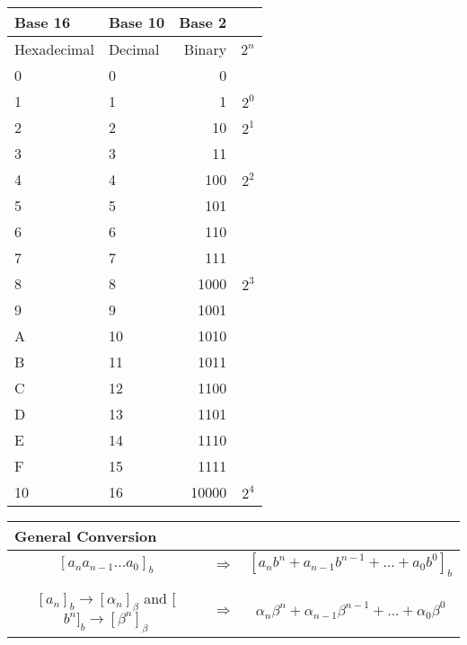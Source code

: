 \documentclass[11pt,a4paper]{article}
\begin{document}
\begin{table}[H]
\begin{tabular}{ll}
\end{tabular} 
\quad
\begin{tabular}{|llr|r} \midrule
Base 16 	& Base 10 & Base 2 \\ \midrule
Hexadecimal & Decimal & Binary & $2^{n}$\\ \midrule \midrule 
0 	& 0 	& 0 	\\ 
1 	& 1 	& 1 & $2^{0}$	\\ 
2 	& 2 	& 10 & $2^{1}$	\\ 
3 	& 3 	& 11 	\\ 
4 	& 4 	& 100 & $2^{2}$	\\ 
5 	& 5 	& 101 	\\ 
6 	& 6 	& 110 	\\ 
7 	& 7 	& 111 	\\ 
8 	& 8 	& 1000	& $2^{3}$\\ 
9 	& 9 	& 1001 	\\ 
A 	& 10 	& 1010 	\\ 
B 	& 11 	& 1011 	\\ 
C 	& 12 	& 1100 	\\ 
D 	& 13 	& 1101 	\\ 
E 	& 14 	& 1110 	\\ 
F 	& 15 	& 1111 	\\ 
10 	& 16 	& 10000 &$2^{4}$\\ \midrule
\end{tabular} 
\end{table}

\begin{table}[H]
\begin{tabular}{ccc}
\multicolumn{3}{l}{\textbf{General Conversion}} \\ \midrule
$[a_{n} a_{n-1}...a_{0}]_{b}$ & $\Longrightarrow$ & $[a_{n} b^{n} + a_{n-1} b^{n-1} + ... + a_{0} b^{0}]_{b}$ \\ 
\multicolumn{3}{l}{} \\
$[a_{n}]_{b} \to [\alpha_{n}]_{\beta}$ and [$b^{n}]_{b} \to [\beta^{n}]_{\beta}$ & $\Longrightarrow$ & $\alpha_{n} \beta^{n} + \alpha_{n-1} \beta^{n-1} + ... + \alpha_{0} \beta^{0}$ \\ \midrule
\end{tabular} 
\end{table}
\end{document}
